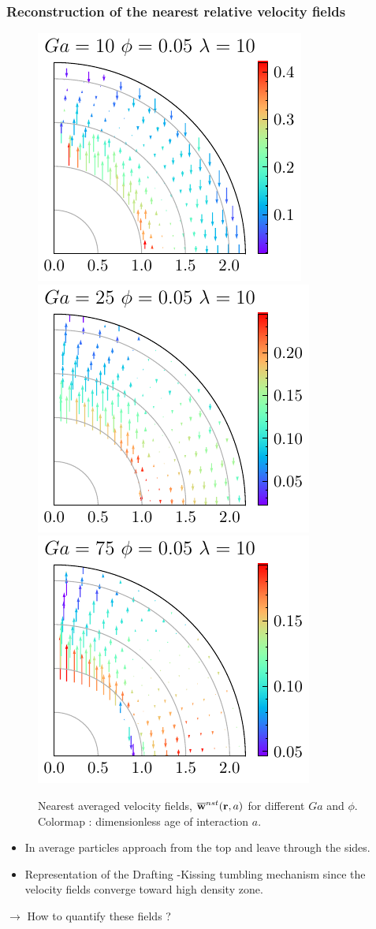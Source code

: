 \documentclass{sintefbeamer}
\begin{document}
\begin{frame}
  \frametitle{Reconstruction of the nearest relative velocity fields}

  \begin{figure}
    
    \includegraphics[height=0.25\textwidth]{image/HOMOGENEOUS/fDrop/U_mu_r_0_1_Ga_10_PHI_0_05.pdf}
    \includegraphics[height=0.25\textwidth]{image/HOMOGENEOUS/fDrop/U_mu_r_0_1_Ga_25_PHI_0_05.pdf}
    \includegraphics[height=0.25\textwidth]{image/HOMOGENEOUS/fDrop/U_mu_r_0_1_Ga_75_PHI_0_05.pdf}
    
    \caption{Nearest averaged velocity fields, $\overline{\textbf{w}}^{nst} (\textbf{r},a)$ for different $Ga$ and $\phi$. 
    Colormap : dimensionless age of interaction $a$. }
  \end{figure}

\begin{itemize}
  \item In average particles approach from the top and leave through the sides. 
  \item Representation of the Drafting -Kissing tumbling mechanism since the velocity fields converge toward high density zone. 
\end{itemize}
$\rightarrow$ How to quantify these fields ?
\end{frame}
\end{document}
